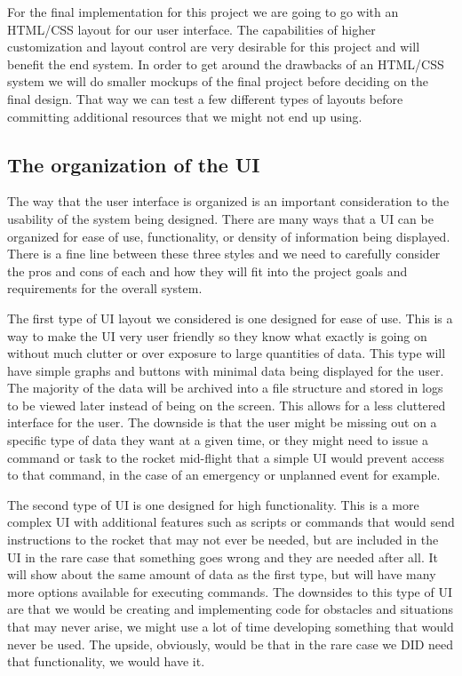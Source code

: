 \documentclass[10pt,draftclsnofoot,onecolumn]{IEEEtran}
\begin{document}
	For the final implementation for this project we are going to go with an HTML/CSS layout for our user interface. The capabilities of higher customization and layout control are very desirable for this project and will benefit the end system. In order to get around the drawbacks of an HTML/CSS system we will do smaller mockups of the final project before deciding on the final design. That way we can test a few different types of layouts before committing additional resources that we might not end up using.\par

\subsection{The organization of the UI}
The way that the user interface is organized is an important consideration to the usability of the system being designed. There are many ways that a UI can be organized for ease of use, functionality, or density of information being displayed. There is a fine line between these three styles and we need to carefully consider the pros and cons of each and how they will fit into the project goals and requirements for the overall system. \par

	The first type of UI layout we considered is one designed for ease of use. This is a way to make the UI very user friendly so they know what exactly is going on without much clutter or over exposure to large quantities of data. This type will have simple graphs and buttons with minimal data being displayed for the user. The majority of the data will be archived into a file structure and stored in logs to be viewed later instead of being on the screen. This allows for a less cluttered interface for the user. The downside is that the user might be missing out on a specific type of data they want at a given time, or they might need to issue a command or task to the rocket mid-flight that a simple UI would prevent access to that command, in the case of an emergency or unplanned event for example. \par
	
	The second type of UI is one designed for high functionality. This is a more complex UI with additional features such as scripts or commands that would send instructions to the rocket that may not ever be needed, but are included in the UI in the rare case that something goes wrong and they are needed after all. It will show about the same amount of data as the first type, but will have many more options available for executing commands. The downsides to this type of UI are that we would be creating and implementing code for obstacles and situations that may never arise, we might use a lot of time developing something that would never be used. The upside, obviously, would be that in the rare case we DID need that functionality, we would have it. \par
	
\end{document}
